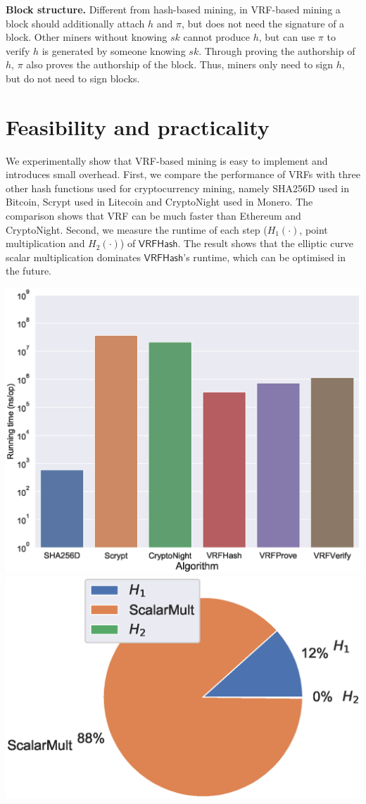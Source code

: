 \documentclass[a0,portrait]{a0poster}
\begin{document}
\begin{multicols}{2}
    \textbf{Block structure.}
    Different from hash-based mining, in VRF-based mining a block should additionally attach $h$ and $\pi$, but does not need the signature of a block.
    Other miners without knowing $sk$ cannot produce $h$, but can use $\pi$ to verify $h$ is generated by someone knowing $sk$.
    Through proving the authorship of $h$, $\pi$ also proves the authorship of the block.
    Thus, miners only need to sign $h$, but do not need to sign blocks.


    \section*{Feasibility and practicality}

    We experimentally show that VRF-based mining is easy to implement and introduces small overhead.
    First, we compare the performance of VRFs with three other hash functions used for cryptocurrency mining, namely SHA256D used in Bitcoin, Scrypt used in Litecoin and CryptoNight used in Monero.
    The comparison shows that VRF can be much faster than Ethereum and CryptoNight.
    Second, we measure the runtime of each step ($H_1(\cdot)$, point multiplication and $H_2(\cdot)$) of $\mathsf{VRFHash}$.
    The result shows that the elliptic curve scalar multiplication dominates $\mathsf{VRFHash}$'s runtime, which can be optimised in the future.

    \begin{center}\vspace{1cm}
        \includegraphics[width=.45\linewidth]{figs/runtime-comparison.eps}
        \includegraphics[width=.45\linewidth]{figs/runtime-breakdown.eps}
    \end{center}\vspace{1cm}



\end{multicols}
\end{document}
